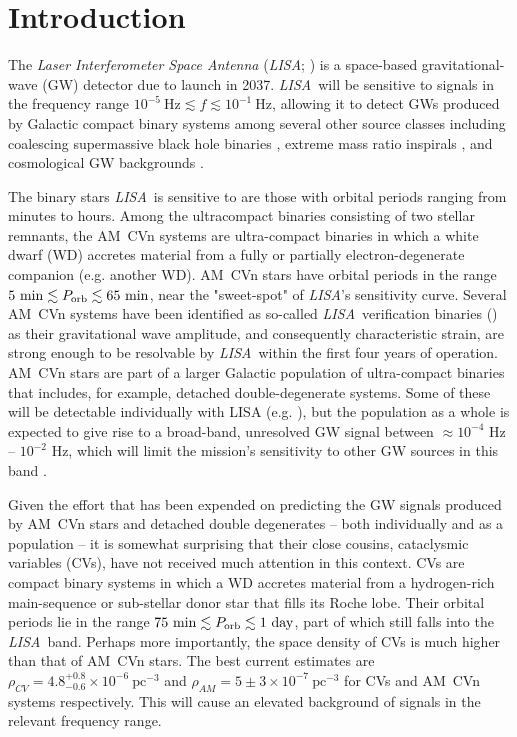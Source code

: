 \documentclass[fleqn,usenatbib]{mnras}
\newcommand{\lisa}{{\it LISA}}
\begin{document}
\section{Introduction}
\label{sec:intro}

The \textit{Laser Interferometer Space Antenna} (\lisa; \citealt{lisa17}) is a space-based gravitational-wave (GW) detector due to launch in 2037. \lisa\ will be sensitive to signals in the frequency range $10^{-5}~\mathrm{Hz} \lesssim f \lesssim 10^{-1}~\mathrm{Hz}$, allowing 
it to detect GWs produced by Galactic compact binary systems among several other source classes including coalescing supermassive black hole binaries \citep[e.g.][]{Klein2016, Bellovary2019}, extreme mass ratio inspirals \citep[e.g.][]{Berti2006, Barack2007}, and cosmological GW backgrounds \citep[][]{Caprini2016, Bartolo2016}.

The binary stars \lisa\ is sensitive to are those with orbital periods ranging from minutes to hours. Among the ultracompact binaries consisting of two stellar remnants, the AM~CVn systems are ultra-compact binaries in which a white dwarf (WD) accretes material from a fully or partially electron-degenerate companion (e.g. another WD). AM~CVn stars have orbital periods in the range $5~\mathrm{min} \lesssim P_{\rm{orb}} \lesssim 65~\mathrm{min}$, near the "sweet-spot" of \lisa's sensitivity curve. Several AM~CVn systems have been identified as so-called \lisa\ verification binaries (\citealt{kupfer18,kupfer23}) as their gravitational wave amplitude, and consequently characteristic strain, are strong enough to be resolvable by \lisa\ within the first four years of operation. AM~CVn stars are part of a larger Galactic population of ultra-compact binaries that includes, for example, detached double-degenerate systems. Some of these will be detectable individually with LISA (e.g. \citealt{burdge20}), but the population as a whole is expected to give rise to a broad-band, unresolved GW signal between $\approx 10^{-4}$ Hz -- $10^{-2}$ Hz, which will limit the mission's sensitivity to other GW sources in this band \citep{nelemans01, ruiter10, nissanke12, korol17, lamberts19, breivik20a, breivik2020b, korol22, thiele2023}.

Given the effort that has been expended on predicting the GW signals produced by AM~CVn stars and detached double degenerates -- both individually and as a population -- it is somewhat surprising that their close cousins, cataclysmic variables (CVs), have not received much attention in this context. CVs are compact binary systems in which a WD accretes material from a hydrogen-rich main-sequence or sub-stellar donor star that fills its Roche lobe. Their orbital periods lie in the range $75~\mathrm{min} \lesssim P_{\rm{orb}} \lesssim 1~\mathrm{day}$, part of which still falls into the \lisa\ band. Perhaps more importantly, the space density of CVs is much higher than that of AM~CVn stars. The best current estimates are $\rho_{CV} = 4.8^{+0.8}_{-0.6} \times 10^{-6}~\mathrm{pc^{-3}}$\citep{pala20} and $\rho_{AM} = 5\pm 3 \times 10^{-7}~\mathrm{pc^{-3}}$\citep{carter13} for CVs and AM~CVn systems respectively. This will cause an elevated background of signals in the relevant frequency range. 
\end{document}
